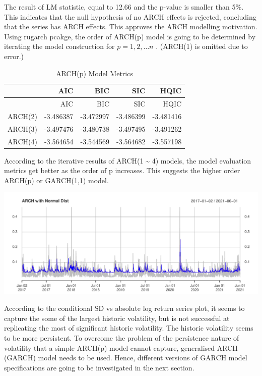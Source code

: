 \documentclass[
  11pt,
]{article}
\begin{document}
The result of LM statistic, equal to 12.66 and the p-value is smaller
than 5\%. This indicates that the null hypothesis of no ARCH effects is
rejected, concluding that the series has ARCH effects. This approves the
ARCH modelling motivation. Using rugarch pcakge, the order of ARCH(p)
model is going to be determined by iterating the model construction for
\(p=1,2,…n\) . (ARCH(1) is omitted due to error.)

\begin{longtable}[]{@{}lrrrr@{}}
\caption{ARCH(p) Model Metrics}\tabularnewline
\toprule
& AIC & BIC & SIC & HQIC \\
\midrule
\endfirsthead
\toprule
& AIC & BIC & SIC & HQIC \\
\midrule
\endhead
ARCH(2) & -3.486387 & -3.472997 & -3.486399 & -3.481416 \\
ARCH(3) & -3.497476 & -3.480738 & -3.497495 & -3.491262 \\
ARCH(4) & -3.564654 & -3.544569 & -3.564682 & -3.557198 \\
\bottomrule
\end{longtable}

According to the iterative results of ARCH(1 \textasciitilde{} 4)
models, the model evaluation metrics get better as the order of p
increases. This suggests the higher order ARCH(p) or GARCH(1,1) model.

\includegraphics{ST436_Project_files/figure-latex/unnamed-chunk-22-1.pdf}

According to the conditional SD vs absolute log return series plot, it
seems to capture the some of the largest historic volatility, but is not
successful at replicating the most of significant historic volatility.
The historic volatility seems to be more persistent. To overcome the
problem of the persistence nature of volatility that a simple ARCH(p)
model cannot capture, generalised ARCH (GARCH) model needs to be used.
Hence, different versions of GARCH model specifications are going to be
investigated in the next section.
\end{document}
